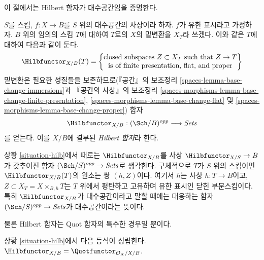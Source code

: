 \noindent
이 절에서는 Hilbert 함자가 대수공간임을 증명한다.

\begin{situation}
\label{situation-hilb}
$S$를 스킴, $f : X \to B$를 $S$ 위의 대수공간의 사상이라 하자.
$f$가 유한 표시라고 가정하자. $B$ 위의 임의의 스킴 $T$에 대하여
$T$로의 $X$의 밑변환을 $X_T$라 쓰겠다. 이와 같은 $T$에 대하여
다음과 같이 둔다.
$$
\Hilbfunctor_{X/B}(T) =
\left\{
\begin{matrix}
\text{closed subspaces }Z \subset X_T\text{ such that }Z \to T\\
\text{is of finite presentation, flat, and proper}
\end{matrix}
\right\}
$$
밑변환은 필요한 성질들을 보존하므로(『공간』의 보조정리
\ref{spaces-lemma-base-change-immersions}과 『공간의 사상』의 보조정리
\ref{spaces-morphisms-lemma-base-change-finite-presentation},
\ref{spaces-morphisms-lemma-base-change-flat} 및
\ref{spaces-morphisms-lemma-base-change-proper})
함자
\begin{equation}
\label{equation-hilb}
\Hilbfunctor_{X/B} : (\Sch/B)^{opp} \longrightarrow \textit{Sets}
\end{equation}
를 얻는다. 이를 $X/B$에 결부된 {\it Hilbert 함자}라 한다.
\end{situation}

\noindent
상황 \ref{situation-hilb}에서 때로는 $\Hilbfunctor_{X/B}$를 사상
$\Hilbfunctor_{X/S} \to B$가 갖추어진 함자
$(\Sch/S)^{opp} \to \textit{Sets}$로 생각한다. 구체적으로 $T$가
$S$ 위의 스킴이면 $\Hilbfunctor_{X/B}(T)$의 원소는 쌍 $(h, Z)$이다.
여기서 $h$는 사상 $h : T \to B$이고,
$Z \subset X_T = X \times_{B, h} T$는 $T$ 위에서 평탄하고 고유하며
유한 표시인 닫힌 부분스킴이다. 특히 $\Hilbfunctor_{X/B}$가 대수공간이라고
말할 때에는 대응하는 함자
$(\Sch/S)^{opp} \to \textit{Sets}$가 대수공간이라는 뜻이다.

\medskip\noindent
물론 Hilbert 함자는 Quot 함자의 특수한 경우일 뿐이다.

\begin{lemma}
\label{lemma-hilb-is-quot}
상황 \ref{situation-hilb}에서 다음 등식이 성립한다.
$\Hilbfunctor_{X/B} = \Quotfunctor_{\mathcal{O}_X/X/B}$.
\end{lemma}

